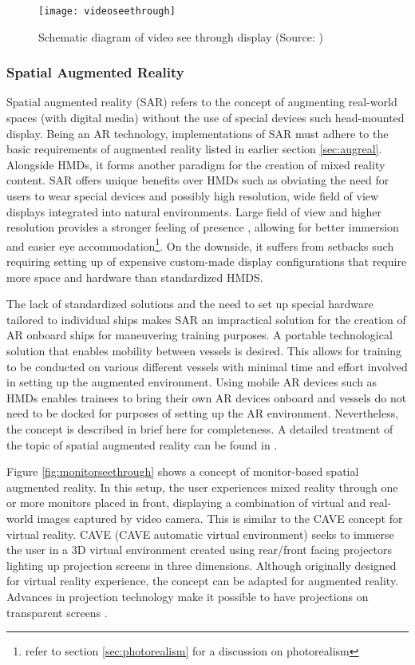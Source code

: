 \begin{figure}
	\centering
	\texttt{[image: videoseethrough]}
	\caption{Schematic diagram of video see through display (Source: \cite{azuma1997survey})}
	\label{fig:videoseethrough}
\end{figure}

\subsubsection{Spatial Augmented Reality}

Spatial augmented reality (SAR) refers to the concept of augmenting real-world spaces (with digital media) without the use of special devices such head-mounted display. Being an AR technology, implementations of SAR must adhere to the basic requirements of augmented reality listed in earlier section \ref{sec:augreal}. Alongside HMDs, it forms another paradigm for the creation of mixed reality content. SAR offers unique benefits over HMDs such as obviating the need for users to wear special devices and possibly high resolution, wide field of view displays integrated into natural environments. Large field of view and higher resolution provides a stronger feeling of presence \parencite{lantz1996future}, allowing for better immersion and easier eye accommodation\footnote{refer to section \ref{sec:photorealism} for a discussion on photorealism}. On the downside, it suffers from setbacks such requiring setting up of expensive custom-made display configurations that require more space and hardware than standardized HMDS.
 
The lack of standardized solutions and the need to set up special hardware tailored to individual ships makes SAR an impractical solution for the creation of AR onboard ships for maneuvering training purposes. A portable technological solution that enables mobility between vessels is desired. This allows for training to be conducted on various different vessels with minimal time and effort involved in setting up the augmented environment. Using mobile AR devices such as HMDs enables trainees to bring their own AR devices onboard and vessels do not need to be docked for purposes of setting up the AR environment. Nevertheless, the concept is described in brief here for completeness. A detailed treatment of the topic of spatial augmented reality can be found in \cite{bimber2005spatial}.

Figure \ref{fig:monitorseethrough} shows a concept of monitor-based spatial augmented reality. In this setup, the user experiences mixed reality through one or more monitors placed in front, displaying a combination of virtual and real-world images captured by video camera. This is similar to the CAVE \parencite{cruz1993surround} concept for virtual reality. CAVE (CAVE automatic virtual environment) seeks to immerse the user in a 3D virtual environment created using rear/front facing projectors lighting up projection screens in three dimensions. Although originally designed for virtual reality experience, the concept can be adapted for augmented reality. Advances in projection technology make it possible to have projections on transparent screens \parencite{peterson2006human}. 

